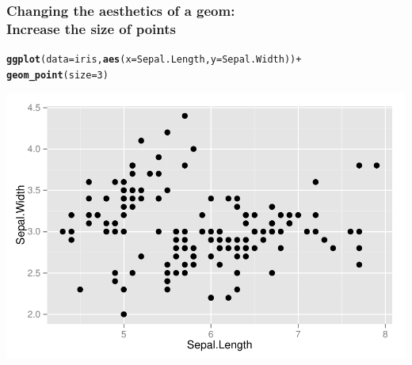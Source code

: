 \documentclass{beamer}\usepackage[]{graphicx}\usepackage[]{color}
\makeatletter
\newcommand{\hlnum}[1]{\textcolor[rgb]{0.686,0.059,0.569}{#1}}%
\newcommand{\hlopt}[1]{\textcolor[rgb]{0,0,0}{#1}}%
\newcommand{\hlstd}[1]{\textcolor[rgb]{0.345,0.345,0.345}{#1}}%
\newcommand{\hlkwc}[1]{\textcolor[rgb]{0.333,0.667,0.333}{#1}}%
\newcommand{\hlkwd}[1]{\textcolor[rgb]{0.737,0.353,0.396}{\textbf{#1}}}%
\newenvironment{kframe}{%
 \def\at@end@of@kframe{}%
 \ifinner\ifhmode%
  \def\at@end@of@kframe{\end{minipage}}%
  \begin{minipage}{\columnwidth}%
 \fi\fi%
 \def\FrameCommand##1{\hskip\@totalleftmargin \hskip-\fboxsep
 \colorbox{shadecolor}{##1}\hskip-\fboxsep
     \hskip-\linewidth \hskip-\@totalleftmargin \hskip\columnwidth}%
 \MakeFramed {\advance\hsize-\width
   \@totalleftmargin\z@ \linewidth\hsize
   \@setminipage}}%
 {\par\unskip\endMakeFramed%
 \at@end@of@kframe}
\newenvironment{knitrout}{}{} %
\makeatother
\begin{document}
\begin{frame}[fragile]
\frametitle{Changing the aesthetics of a geom: \\Increase the size of points}
\begin{knitrout}\footnotesize
{}\color{fgcolor}\begin{kframe}
\begin{alltt}
\hlkwd{ggplot}\hlstd{(}\hlkwc{data} \hlstd{= iris,} \hlkwd{aes}\hlstd{(}\hlkwc{x} \hlstd{= Sepal.Length,} \hlkwc{y} \hlstd{= Sepal.Width))} \hlopt{+}
    \hlkwd{geom_point}\hlstd{(}\hlkwc{size} \hlstd{=} \hlnum{3}\hlstd{)}
\end{alltt}
\end{kframe}

{\centering \includegraphics[width=.75\linewidth]{figure/first_plot_size_} 

}



\end{knitrout}
\end{frame}

\end{document}
